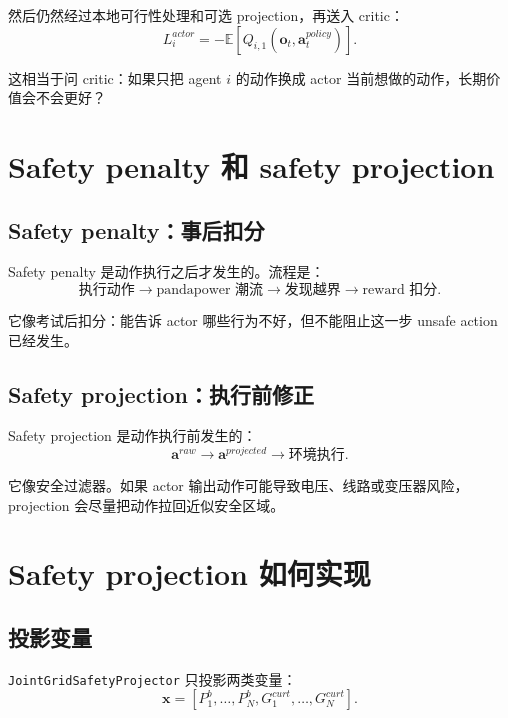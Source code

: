 \documentclass[UTF8,zihao=-4]{ctexart}
\begin{document}
然后仍然经过本地可行性处理和可选 projection，再送入 critic：
\begin{equation}
L^{actor}_i
=
-
\mathbb{E}
\left[
Q_{i,1}(\bm{o}_t,\bm{a}^{policy}_t)
\right].
\end{equation}

这相当于问 critic：如果只把 agent $i$ 的动作换成 actor 当前想做的动作，长期价值会不会更好？

\section{Safety penalty 和 safety projection}

\subsection{Safety penalty：事后扣分}

Safety penalty 是动作执行之后才发生的。流程是：
\begin{equation}
\text{执行动作}
\rightarrow
\text{pandapower 潮流}
\rightarrow
\text{发现越界}
\rightarrow
\text{reward 扣分}.
\end{equation}

它像考试后扣分：能告诉 actor 哪些行为不好，但不能阻止这一步 unsafe action 已经发生。

\subsection{Safety projection：执行前修正}

Safety projection 是动作执行前发生的：
\begin{equation}
\bm a^{raw}
\rightarrow
\bm a^{projected}
\rightarrow
\text{环境执行}.
\end{equation}

它像安全过滤器。如果 actor 输出动作可能导致电压、线路或变压器风险，projection 会尽量把动作拉回近似安全区域。

\section{Safety projection 如何实现}

\subsection{投影变量}

\texttt{JointGridSafetyProjector} 只投影两类变量：
\begin{equation}
\bm{x}
=
\left[
P^b_1,\dots,P^b_N,
G^{curt}_1,\dots,G^{curt}_N
\right].
\end{equation}
\end{document}
